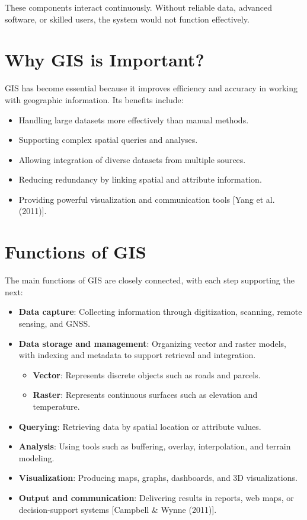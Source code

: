\documentclass[
  11pt,
  letterpaper,
]{book}
\providecommand{\tightlist}{%
  \setlength{\itemsep}{0pt}\setlength{\parskip}{0pt}}
\begin{document}
These components interact continuously. Without reliable data, advanced
software, or skilled users, the system would not function effectively.

\section{Why GIS is Important?}\label{why-gis-is-important}

GIS has become essential because it improves efficiency and accuracy in
working with geographic information. Its benefits include:

\begin{itemize}
\tightlist
\item
  Handling large datasets more effectively than manual methods.
\item
  Supporting complex spatial queries and analyses.
\item
  Allowing integration of diverse datasets from multiple sources.
\item
  Reducing redundancy by linking spatial and attribute information.
\item
  Providing powerful visualization and communication tools {[}Yang et
  al. (2011){]}.
\end{itemize}

\section{Functions of GIS}\label{functions-of-gis}

The main functions of GIS are closely connected, with each step
supporting the next:

\begin{itemize}
\item
  \textbf{Data capture}: Collecting information through digitization,
  scanning, remote sensing, and GNSS.
\item
  \textbf{Data storage and management}: Organizing vector and raster
  models, with indexing and metadata to support retrieval and
  integration.

  \begin{itemize}
  \tightlist
  \item
    \textbf{Vector}: Represents discrete objects such as roads and
    parcels.
  \item
    \textbf{Raster}: Represents continuous surfaces such as elevation
    and temperature.
  \end{itemize}
\item
  \textbf{Querying}: Retrieving data by spatial location or attribute
  values.
\item
  \textbf{Analysis}: Using tools such as buffering, overlay,
  interpolation, and terrain modeling.
\item
  \textbf{Visualization}: Producing maps, graphs, dashboards, and 3D
  visualizations.
\item
  \textbf{Output and communication}: Delivering results in reports, web
  maps, or decision-support systems {[}Campbell \& Wynne (2011){]}.
\end{itemize}
\end{document}
